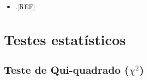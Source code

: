 \documentclass[
  a4paper,
]{book}
\providecommand{\tightlist}{%
  \setlength{\itemsep}{0pt}\setlength{\parskip}{0pt}}
\begin{document}
\begin{itemize}
\tightlist
\item
  .{[}REF{]}
\end{itemize}

\hypertarget{testes-estatisticos}{%
\chapter{\texorpdfstring{\textbf{Testes estatísticos}}{Testes estatísticos}}\label{testes-estatisticos}}

\hypertarget{teste-de-qui-quadrado-chi2}{%
\section{\texorpdfstring{Teste de Qui-quadrado (\(\chi^2\))}{Teste de Qui-quadrado (\textbackslash chi\^{}2)}}\label{teste-de-qui-quadrado-chi2}}
\end{document}
